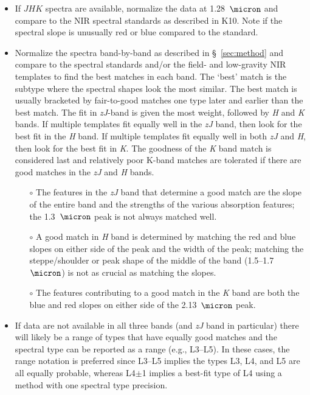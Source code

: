 \documentclass[modern]{aastex61}
\begin{document}
\begin{itemize}
	\item If $JHK$ spectra are available, normalize the data at 1.28~$\micron$ and compare to the NIR spectral standards as described in K10. Note if the spectral slope is unusually red or blue compared to the standard.

	\item Normalize the spectra band-by-band as described in \S~\ref{sec:method} and compare to the spectral standards and/or the field- and low-gravity NIR templates to find the best matches in each band.
	The `best' match is the subtype where the spectral shapes look the most similar. The best match is usually bracketed by fair-to-good matches one type later and earlier than the best match.
	The fit in \emph{zJ}-band is given the most weight, followed by \emph{H} and \emph{K} bands.
	If multiple templates fit equally well in the \emph{zJ} band, then look for the best fit in the \emph{H} band.
	If multiple templates fit equally well in both \emph{zJ} and \emph{H}, then look for the best fit in \emph{K}.
	The goodness of the \emph{K} band match is considered last and relatively poor K-band matches are tolerated if there are good matches in the \emph{zJ} and \emph{H} bands.
	\begin{itemize}
		\item[$\circ$] The features in the \emph{zJ} band that determine a good match are the slope of the entire band and the strengths of the various absorption features; the 1.3~$\micron$ peak is not always matched well.
		\item[$\circ$] A good match in \emph{H} band is determined by matching the red and blue slopes on either side of the peak and the width of the peak; matching the steppe/shoulder or peak shape of the middle of the band (1.5--1.7~$\micron$) is not as crucial as matching the slopes.
		\item[$\circ$] The features contributing to a good match in the \emph{K} band are both the blue and red slopes on either side of the 2.13~$\micron$ peak.
	\end{itemize}
	\item If data are not available in all three bands (and \emph{zJ} band in particular) there will likely be a range of types that have equally good matches and the spectral type can be reported as a range (e.g., L3--L5). In these cases, the range notation is preferred since L3--L5 implies the types L3, L4, and L5 are all equally probable, whereas L4$\pm$1 implies a best-fit type of L4 using a method with one spectral type precision.

\end{itemize}
\end{document}
